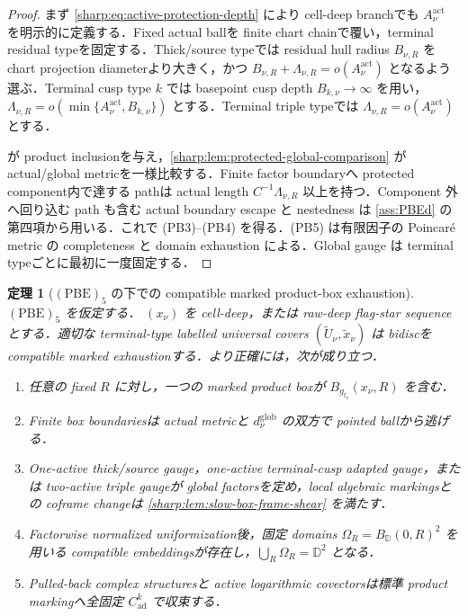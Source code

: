 \documentclass[a4paper,11pt]{ltjsarticle}
\numberwithin{equation}{section}
\theoremstyle{plain}
\newtheorem{theorem}{定理}[section]
\theoremstyle{definition}
\theoremstyle{remark}
\begin{document}
\begin{proof}
まず \eqref{sharp:eq:active-protection-depth} により cell-deep branchでも $A_\nu^{\mathrm{act}}$ を明示的に定義する．Fixed actual ballを finite chart chainで覆い，terminal residual typeを固定する．Thick/source typeでは residual hull radius $B_{\nu,R}$ を chart projection diameterより大きく，かつ $B_{\nu,R}+\Lambda_{\nu,R}=o(A_\nu^{\mathrm{act}})$ となるよう選ぶ．Terminal cusp type $k$ では basepoint cusp depth $B_{k,\nu}\to\infty$ を用い，$\Lambda_{\nu,R}=o(\min\{A_\nu^{\mathrm{act}},B_{k,\nu}\})$ とする．Terminal triple typeでは $\Lambda_{\nu,R}=o(A_\nu^{\mathrm{act}})$ とする．

 が product inclusionを与え，\cref{sharp:lem:protected-global-comparison} が actual/global metricを一様比較する．Finite factor boundaryへ protected component内で達する pathは actual length $C^{-1}\Lambda_{\nu,R}$ 以上を持つ．Component 外へ回り込む path も含む actual boundary escape と nestedness は \cref{ass:PBEd} の第四項から用いる．これで (PB3)--(PB4) を得る．(PB5) は有限因子の Poincaré metric の completeness と domain exhaustion による．Global gauge は terminal typeごとに最初に一度固定する．
\end{proof}

\begin{theorem}[$\mathrm{(PBE)}_5$ の下での compatible marked product-box exhaustion]\label{sharp:prop:complex-exhaustion}
$\mathrm{(PBE)}_5$ を仮定する．
$(x_\nu)$ を cell-deep，または raw-deep flag-star sequenceとする．適切な terminal-type labelled universal covers $(\widetilde U_\nu,\tilde x_\nu)$ は bidiscを compatible marked exhaustionする．より正確には，次が成り立つ．
\begin{enumerate}[label=\textup{(X\arabic*)}]
\item 任意の fixed $R$ に対し，一つの marked product boxが $B_{g_{t_\nu}}(x_\nu,R)$ を含む．
\item Finite box boundariesは actual metricと $d^{\mathrm{glob}}_\nu$ の双方で pointed ballから逃げる．
\item One-active thick/source gauge，one-active terminal-cusp adapted gauge，または two-active triple gaugeが global factorsを定め，local algebraic markingsとの coframe changeは \cref{sharp:lem:slow-box-frame-shear} を満たす．
\item Factorwise normalized uniformization後，固定 domains $\Omega_R=B_{\mathbb D}(0,R)^2$ を用いる compatible embeddingsが存在し，$\bigcup_R\Omega_R=\mathbb D^2$ となる．
\item Pulled-back complex structuresと active logarithmic covectorsは標準 product markingへ全固定 $C^k_{\mathrm{ad}}$ で収束する．
\end{enumerate}
\end{theorem}
\end{document}
